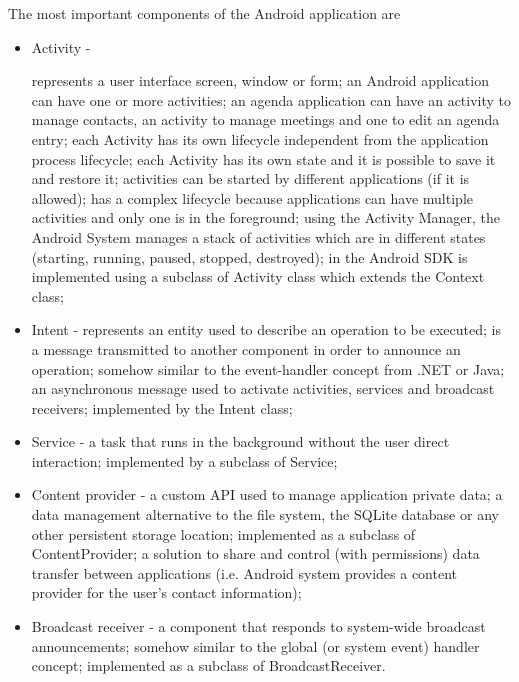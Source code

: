 \documentclass[12pt]{report}
\begin{document}
The most important components of the Android application are
\begin{itemize}


\item Activity - 

    represents a user interface screen, window or form;
    an Android application can have one or more activities; an agenda application can have an activity to manage contacts, an activity to manage meetings and one to edit an agenda entry;
    each Activity has its own lifecycle independent from the application process lifecycle;
    each Activity has its own state and it is possible to save it and restore it;
    activities can be started by different applications (if it is allowed);
    has a complex lifecycle because applications can have multiple activities and only one is in the foreground; using the Activity Manager, the Android System manages a stack of activities which are in different states (starting, running, paused, stopped, destroyed);
    in the Android SDK is implemented using a subclass of Activity class which extends the Context class;

\item Intent - represents an entity used to describe an operation to be executed; is a message transmitted to another component in order to announce an operation;
    somehow similar to the event-handler concept from .NET or Java;
    an asynchronous message used to activate activities, services and broadcast receivers;
    implemented by the Intent class;

\item Service - a task that runs in the background without the user direct interaction;
    implemented by a subclass of Service;

\item Content provider - a custom API used to manage application private data;
    a data management alternative to the file system, the SQLite database or any other persistent storage location;
    implemented as a subclass of ContentProvider;
    a solution to share and control (with permissions) data transfer between applications (i.e. Android system provides a content provider for the user’s contact information);

\item Broadcast receiver - a component that responds to system-wide broadcast announcements;
    somehow similar to the global (or system event) handler concept;
    implemented as a subclass of BroadcastReceiver.

\end{itemize}
\end{document}
